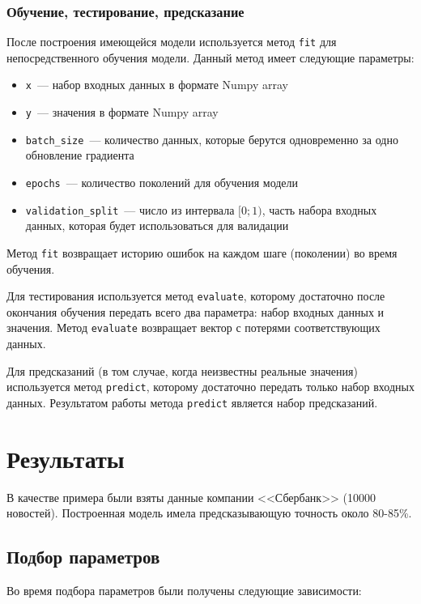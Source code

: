 \documentclass[14pt]{matmex-diploma-custom}
\begin{document}
\subsubsection{Обучение, тестирование, предсказание}

После построения имеющейся модели используется метод \texttt{fit} для непосредственного обучения модели. Данный метод имеет следующие параметры:

\begin{itemize}
\item \texttt{x}~--- набор входных данных в формате Numpy array
\item \texttt{y}~--- значения в формате Numpy array
\item \texttt{batch\_size}~--- количество данных, которые берутся одновременно за одно обновление градиента
\item \texttt{epochs}~--- количество поколений для обучения модели
\item \texttt{validation\_split}~--- число из интервала $[0;1)$, часть набора входных данных, которая будет использоваться для валидации
\end{itemize}

Метод \texttt{fit} возвращает историю ошибок на каждом шаге (поколении) во время обучения.

Для тестирования используется метод \texttt{evaluate}, которому достаточно после окончания обучения передать всего два параметра: набор входных данных и значения. Метод \texttt{evaluate} возвращает вектор с потерями соответствующих данных.

Для предсказаний (в том случае, когда неизвестны реальные значения) используется метод \texttt{predict}, которому достаточно передать только набор входных данных. Результатом работы метода \texttt{predict} является набор предсказаний.

\clearpage\section{Результаты}

В качестве примера были взяты данные компании <<Сбербанк>> (10000 новостей). Построенная модель имела предсказывающую точность около 80-85\%.

\subsection{Подбор параметров}

Во время подбора параметров были получены следующие зависимости:
\end{document}
